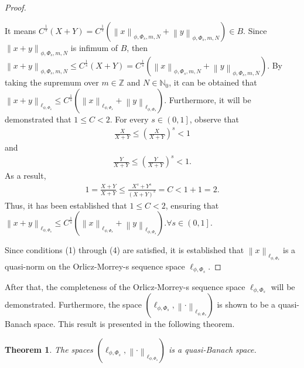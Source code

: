 \documentclass[12pt,a4paper]{article}
\newtheorem{theorem}[definition]{Theorem}
\theoremstyle{remark}
\begin{document}
\begin{proof}
\begin{enumerate}
        It means $C^{\frac{1}{s}}\left(X+Y\right)=C^{\frac{1}{s}}\left(\left\lVert x \right\rVert _{\phi, \Phi_s, m, N}+\left\lVert y \right\rVert _{\phi, \Phi_s, m, N}\right)\in B$. Since $\left\lVert x+y \right\rVert _{\phi, \Phi_s, m, N}$ is infimum of $B$, then $\left\lVert x+y \right\rVert _{\phi, \Phi_s, m, N}\leq C^{\frac{1}{s}}\left(X+Y\right)=C^{\frac{1}{s}}\left(\left\lVert x \right\rVert _{\phi, \Phi_s, m, N}+\left\lVert y \right\rVert _{\phi, \Phi_s, m, N}\right)$.
        By taking the supremum over $m \in \mathbb{Z}$ and $N \in \mathbb{N}_0$, it can be obtained that $\left\lVert x+y \right\rVert _{\ell_{\phi,\Phi_s}}\leq C^{\frac{1}{s}} \left(\left\lVert x \right\rVert _{\ell_{\phi, \Phi_s}} + \left\lVert y \right\rVert _{\ell_{\phi, \Phi_s}} \right)$.
        Furthermore, it will be demonstrated that $1 \leq C < 2$. For every $s \in \left(0,1\right]$, observe that
        \begin{eqnarray*}
            \frac{X}{X + Y} \leq \left(\frac{X}{X + Y}\right)^s < 1
        \end{eqnarray*}
        and
        \begin{eqnarray*}
            \frac{Y}{X + Y} \leq \left(\frac{Y}{X + Y}\right)^s < 1.
        \end{eqnarray*}
        As a result,
        \begin{eqnarray*}
            1 = \frac{X + Y}{X + Y} \leq \frac{X^s + Y^s}{(X + Y)^s} = C < 1 + 1 = 2.
        \end{eqnarray*}
        Thus, it has been established that \(1 \leq C < 2\), ensuring that $\left\lVert x+y \right\rVert _{\ell_{\phi,\Phi_s}}\leq C^{\frac{1}{s}} \left(\left\lVert x \right\rVert _{\ell_{\phi, \Phi_s}} + \left\lVert y \right\rVert _{\ell_{\phi, \Phi_s}} \right). \forall s\in \left(0,1\right]$.  
    \end{enumerate} 
    Since conditions (1) through (4) are satisfied, it is established that $\left\lVert x \right\rVert _{\ell_{\phi, \Phi_s}}$ is a quasi-norm on the Orlicz-Morrey-s sequence space $\ell_{\phi, \Phi_s}$.
\end{proof}

After that, the completeness of the Orlicz-Morrey-s sequence space $\ell_{\phi, \Phi_s}$ will be demonstrated. Furthermore, the space $\left(\ell_{\phi, \Phi_s}, \left\lVert \cdot \right\rVert_{\ell_{\phi, \Phi_s}}\right)$ is shown to be a quasi-Banach space. This result is presented in the following theorem.

\begin{theorem}
    The spaces $\left(\ell_{\phi, \Phi_s}, \left\lVert \cdot \right\rVert_{\ell_{\phi, \Phi_s}}\right)$ is a quasi-Banach space.
\end{theorem}
\end{document}
